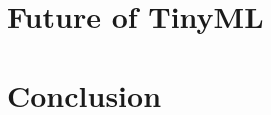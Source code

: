 \documentclass[twocolumn]{article}
\begin{document}
\section{Future of TinyML }
\label{future_of_tinyml}



\section{Conclusion}
\label{conclusion}



\nocite{hussein_original_2024,paul_rethinking_2021}




\end{document}
